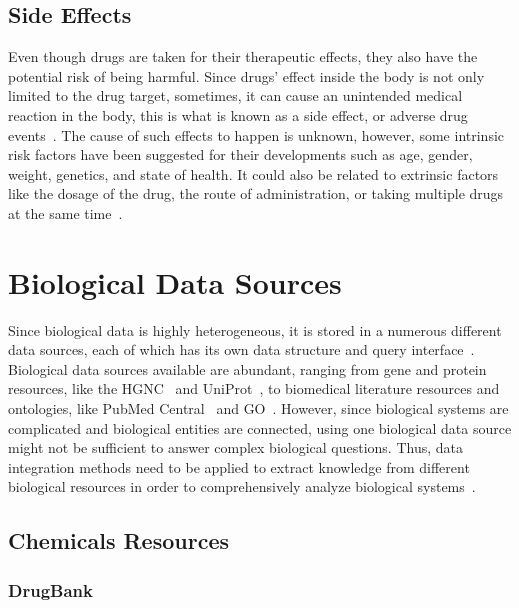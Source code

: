 \subsection{Side Effects}

Even though drugs are taken for their therapeutic effects, they also have the potential risk of being harmful.
Since drugs’ effect inside the body is not only limited to the drug target, sometimes, it can cause an unintended medical reaction in the body, this is what is known as a side effect, or adverse drug events~\cite{pourpak_understanding_2008}.
The cause of such effects to happen is unknown, however, some intrinsic risk factors have been suggested for their developments such as age, gender, weight, genetics, and state of health.
It could also be related to extrinsic factors like the dosage of the drug, the route of administration, or taking multiple drugs at the same time~\cite{pourpak_understanding_2008}.

\section{Biological Data Sources}

Since biological data is highly heterogeneous, it is stored in a numerous different data sources, each of which has its own data structure and query interface~\cite{baralis_exploring_2008}.
Biological data sources available are abundant, ranging from gene and protein resources, like the \ac{HGNC}~\cite{baralis_exploring_2008} and UniProt~\cite{noauthor_uniprot:_2019}, to biomedical literature resources and ontologies, like PubMed Central~\cite{roberts_pubmed_2001} and \ac{GO}~\cite{noauthor_gene_2008}.
However, since biological systems are complicated and biological entities are connected, using one biological data source might not be sufficient to answer complex biological questions.
Thus, data integration methods need to be applied to extract knowledge from different biological resources in order to comprehensively analyze biological systems~\cite{baralis_exploring_2008}.

\subsection{Chemicals Resources}

\subsubsection{DrugBank}

